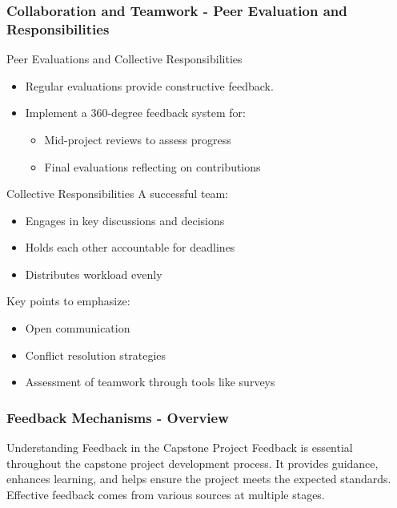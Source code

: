\documentclass{beamer}
\begin{document}
\begin{frame}[fragile]
    \frametitle{Collaboration and Teamwork - Peer Evaluation and Responsibilities}
    \begin{block}{Peer Evaluations and Collective Responsibilities}
        \begin{itemize}
            \item Regular evaluations provide constructive feedback.
            \item Implement a 360-degree feedback system for:
                \begin{itemize}
                    \item Mid-project reviews to assess progress
                    \item Final evaluations reflecting on contributions
                \end{itemize}
        \end{itemize}
        
        \begin{block}{Collective Responsibilities}
            A successful team:
            \begin{itemize}
                \item Engages in key discussions and decisions
                \item Holds each other accountable for deadlines
                \item Distributes workload evenly
            \end{itemize}
            Key points to emphasize:
            \begin{itemize}
                \item Open communication
                \item Conflict resolution strategies
                \item Assessment of teamwork through tools like surveys
            \end{itemize}
        \end{block}
    \end{block}
\end{frame}

\begin{frame}[fragile]
    \frametitle{Feedback Mechanisms - Overview}
    \begin{block}{Understanding Feedback in the Capstone Project}
        Feedback is essential throughout the capstone project development process. It provides guidance, enhances learning, and helps ensure the project meets the expected standards. Effective feedback comes from various sources at multiple stages.
    \end{block}
\end{frame}
\end{document}
